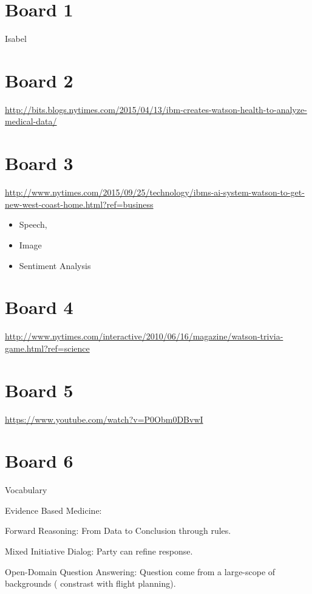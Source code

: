 \documentclass[10pt]{article}
\begin{document}
\MakeScribeTop{}

\section{Board 1}

Isabel

\section{Board 2}

\url{http://bits.blogs.nytimes.com/2015/04/13/ibm-creates-watson-health-to-analyze-medical-data/}

\section{Board 3}

\url{http://www.nytimes.com/2015/09/25/technology/ibms-ai-system-watson-to-get-new-west-coast-home.html?ref=business}

\begin{itemize}
\item Speech,
\item Image
\item Sentiment Analysis
\end{itemize}

\section{Board 4}

\url{http://www.nytimes.com/interactive/2010/06/16/magazine/watson-trivia-game.html?ref=science}

\section{Board 5}

\url{https://www.youtube.com/watch?v=P0Obm0DBvwI}

\section{Board 6}

Vocabulary

Evidence Based Medicine: 

Forward Reasoning: From Data to Conclusion through rules.

Mixed Initiative Dialog: Party can refine response. 

Open-Domain Question Answering: Question come from a large-scope of backgrounds ( constrast with flight planning).
\end{document}
